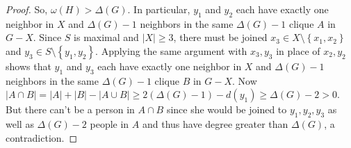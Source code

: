 \documentclass{amsbook}
\theoremstyle{plain}
\numberwithin{equation}{chapter}
\newcommand{\set}[1]{\left\{ #1 \right\}}
\newcommand{\card}[1]{\left|#1\right|}
\begin{document}
\begin{proof}
So, $\omega(H) > \Delta(G)$.  In particular, $y_1$ and $y_2$ each have exactly one neighbor in $X$ and $\Delta(G) - 1$ neighbors in the same $\Delta(G) -1$ clique $A$ in $G - X$.
 Since $S$ is maximal and $\card{X} \ge 3$, there must be joined
$x_3 \in X \setminus \set{x_1,x_2}$ and $y_3 \in S \setminus \set{y_1,y_2}$.  Applying the same argument with $x_3, y_3$ in place of $x_2, y_2$ shows
that $y_1$ and $y_3$ each have exactly one neighbor in $X$ and $\Delta(G) - 1$ neighbors in the same $\Delta(G) -1$ clique $B$ in $G - X$.
Now $\card{A\cap B} = \card{A} + \card{B} - \card{A\cup B} \ge 2(\Delta(G) - 1) - d(y_1) \ge \Delta(G) - 2 > 0$.  But there can't be a person
in $A \cap B$ since she would be joined to $y_1,y_2,y_3$ as well as $\Delta(G) - 2$ people in $A$ and thus have degree greater than $\Delta(G)$, a contradiction. 
\end{proof}
\end{document}
